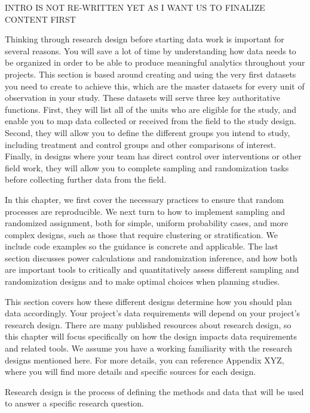 
\begin{fullwidth}

	INTRO IS NOT RE-WRITTEN YET AS I WANT US TO FINALIZE CONTENT FIRST

  Thinking through research design before starting data work
  is important for several reasons.
	You will save a lot of time by understanding how data needs to be organized
	in order to be able to produce meaningful analytics throughout your projects.
  This section is based around creating and using
  the very first datasets you need to create to achieve this,
  which are the master datasets for every unit of observation in your study.
  These datasets will serve three key authoritative functions.
  First, they will list all of the units who are eligible for the study,
  and enable you to map data collected or received from the field to the study design.
  Second, they will allow you to define the different groups you intend to study,
  including treatment and control groups and other comparisons of interest.
  Finally, in designs where your team has direct control over interventions or other field work,
  they will allow you to complete sampling and randomization tasks
  before collecting further data from the field.





	In this chapter, we first cover the necessary practices to ensure that random processes are reproducible.
	We next turn to how to implement sampling and randomized assignment,
	both for simple, uniform probability cases, and more complex designs,
	such as those that require clustering or stratification.
	We include code examples so the guidance is concrete and applicable.
	The last section discusses power calculations and randomization inference,
	and how both are important tools to critically and quantitatively assess different
	sampling and randomization designs and to make optimal choices when planning studies.


  This section covers how these different designs
  determine how you should plan data accordingly.
  Your project's data requirements will depend on your project's research design.
  There are many published resources about research design,
  so this chapter will focus specifically on how the design impacts data requirements
  and related tools.
  We assume you have a working familiarity
  with the research designs mentioned here.
  For more details, you can reference Appendix XYZ,
  where you will find more details and specific sources for each design.



	Research design is the process of defining the methods and data
	that will be used to answer a specific research question.





\end{fullwidth}

